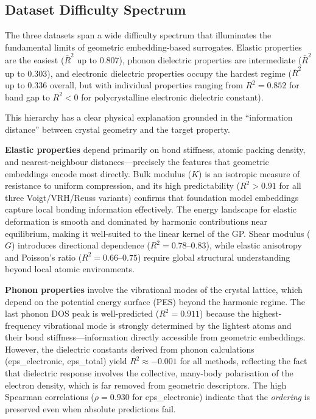 \FloatBarrier
\subsection{Dataset Difficulty Spectrum}
\label{sec:difficulty_spectrum}

The three datasets span a wide difficulty spectrum that illuminates the fundamental limits of geometric embedding-based surrogates.
Elastic properties are the easiest ($\bar{R}^2$ up to 0.807), phonon dielectric properties are intermediate ($\bar{R}^2$ up to 0.303), and electronic dielectric properties occupy the hardest regime ($\bar{R}^2$ up to 0.336 overall, but with individual properties ranging from $R^2 = 0.852$ for band gap to $R^2 < 0$ for polycrystalline electronic dielectric constant).

This hierarchy has a clear physical explanation grounded in the ``information distance'' between crystal geometry and the target property.

\textbf{Elastic properties} depend primarily on bond stiffness, atomic packing density, and nearest-neighbour distances---precisely the features that geometric embeddings encode most directly.
Bulk modulus ($K$) is an isotropic measure of resistance to uniform compression, and its high predictability ($R^2 > 0.91$ for all three Voigt/VRH/Reuss variants) confirms that foundation model embeddings capture local bonding information effectively.
The energy landscape for elastic deformation is smooth and dominated by harmonic contributions near equilibrium, making it well-suited to the linear kernel of the GP.
Shear modulus ($G$) introduces directional dependence ($R^2 = 0.78$--$0.83$), while elastic anisotropy and Poisson's ratio ($R^2 = 0.66$--$0.75$) require global structural understanding beyond local atomic environments.

\textbf{Phonon properties} involve the vibrational modes of the crystal lattice, which depend on the potential energy surface (PES) beyond the harmonic regime.
The last phonon DOS peak is well-predicted ($R^2 = 0.911$) because the highest-frequency vibrational mode is strongly determined by the lightest atoms and their bond stiffness---information directly accessible from geometric embeddings.
However, the dielectric constants derived from phonon calculations (eps\_electronic, eps\_total) yield $R^2 \approx -0.001$ for all methods, reflecting the fact that dielectric response involves the collective, many-body polarisation of the electron density, which is far removed from geometric descriptors.
The high Spearman correlations ($\rho = 0.930$ for eps\_electronic) indicate that the \emph{ordering} is preserved even when absolute predictions fail.


